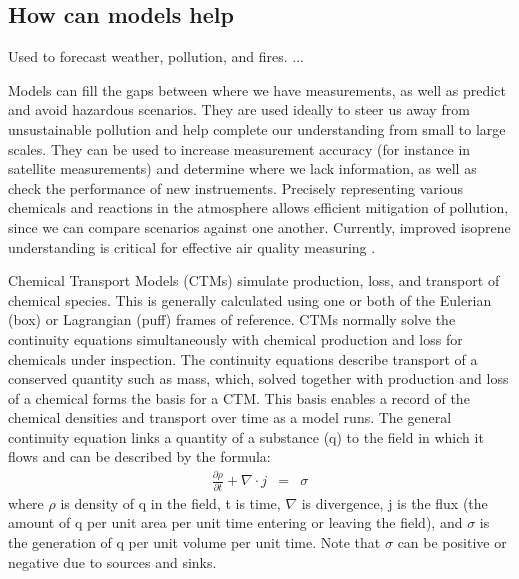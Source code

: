   \subsection{How can models help}
    Used to forecast weather, pollution, and fires. ...
    
    Models can fill the gaps between where we have measurements, as well as predict and avoid hazardous scenarios.
    They are used ideally to steer us away from unsustainable pollution and help complete our understanding from small to large scales.
    They can be used to increase measurement accuracy (for instance in satellite measurements) and determine where we lack information, as well as check the performance of new instruements.
    Precisely representing various chemicals and reactions in the atmosphere allows efficient mitigation of pollution, since we can compare scenarios against one another.
    Currently, improved isoprene understanding is critical for effective air quality measuring \citep{Marvin2017}.
    
    Chemical Transport Models (CTMs) simulate production, loss, and transport of chemical species.
    This is generally calculated using one or both of the Eulerian (box) or Lagrangian (puff) frames of reference.
    CTMs normally solve the continuity equations simultaneously with chemical production and loss for chemicals under inspection. 
    The continuity equations describe transport of a conserved quantity such as mass, which, solved together with production and loss of a chemical forms the basis for a CTM.
    This basis enables a record of the chemical densities and transport over time as a model runs.
    The general continuity equation links a quantity of a substance (q) to the field in which it flows and can be described by the formula:
    \begin{eqnarray*}
      \frac{\partial \rho}{\partial t} + \nabla \cdot j &=& \sigma 
    \end{eqnarray*}
    where $\rho$ is density of q in the field, t is time, $\nabla$ is divergence, j is the flux (the amount of q per unit area per unit time entering or leaving the field), and $\sigma$ is the generation of q per unit volume per unit time.
    Note that $\sigma$ can be positive or negative due to sources and sinks.
    
